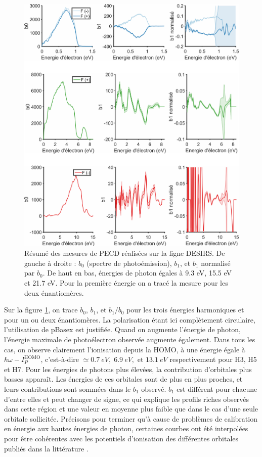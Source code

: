 \begin{figure}[!ht]
\centering
\includegraphics[width=0.98\columnwidth]{Figures/Soleil/Results_PECD.pdf}%
\caption{Résumé des mesures de PECD réalisées sur la ligne DESIRS. De gauche à droite : $b_0$ (spectre de photoémission), $b_1$, et $b_1$ normalisé par $b_0$. De haut en bas, énergies de photon égales à 9.3 eV, 15.5 eV et 21.7 eV. Pour la première énergie on a tracé la mesure pour les deux énantiomères.}
\label{fig:results_pecd}
\end{figure}

Sur la figure \ref{fig:results_pecd}, on trace $b_0$, $b_1$, et $b_1/b_0$ pour les trois énergies harmoniques et pour un ou deux énantiomères. La polarisation étant ici complètement circulaire, l'utilisation de pBasex est justifiée. Quand on augmente l'énergie de photon, l'énergie maximale de photoélectron observée augmente également. Dans tous les cas, on observe clairement l'ionisation depuis la HOMO, à une énergie égale à $\hbar\omega-I_P^\text{HOMO}$, c'est-à-dire $\simeq \SI{0.7}{eV},\; \SI{6.9}{eV},\text{ et }\SI{13.1}{eV}$ respectivement pour H3, H5 et H7. Pour les énergies de photons plus élevées, la contribution d'orbitales plus basses apparaît. Les énergies de ces orbitales sont de plus en plus proches, et leurs contributions sont sommées dans le $b_1$ observé. $b_1$ est différent pour chacune d'entre elles et peut changer de signe, ce qui explique les profils riches observés dans cette région et une valeur en moyenne plus faible que dans le cas d'une seule orbitale sollicitée. Précisons pour terminer qu'à cause de problèmes de calibration en énergie aux hautes énergies de photon, certaines courbes ont été interpolées pour être cohérentes avec les potentiels d'ionisation des différentes orbitales publiés dans la littérature .

